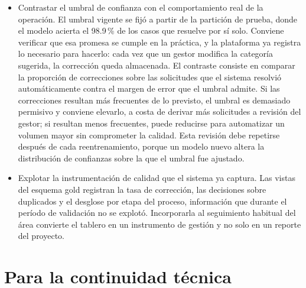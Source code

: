\begin{itemize}
\item Contrastar el umbral de confianza con el comportamiento real de la operación. El umbral vigente se fijó a partir de la partición de prueba, donde el modelo acierta el 98.9\,\% de los casos que resuelve por sí solo. Conviene verificar que esa promesa se cumple en la práctica, y la plataforma ya registra lo necesario para hacerlo: cada vez que un gestor modifica la categoría sugerida, la corrección queda almacenada. El contraste consiste en comparar la proporción de correcciones sobre las solicitudes que el sistema resolvió automáticamente contra el margen de error que el umbral admite. Si las correcciones resultan más frecuentes de lo previsto, el umbral es demasiado permisivo y conviene elevarlo, a costa de derivar más solicitudes a revisión del gestor; si resultan menos frecuentes, puede reducirse para automatizar un volumen mayor sin comprometer la calidad. Esta revisión debe repetirse después de cada reentrenamiento, porque un modelo nuevo altera la distribución de confianzas sobre la que el umbral fue ajustado.

\item Explotar la instrumentación de calidad que el sistema ya captura. Las vistas del esquema gold registran la tasa de corrección, las decisiones sobre duplicados y el desglose por etapa del proceso, información que durante el período de validación no se explotó. Incorporarla al seguimiento habitual del área convierte el tablero en un instrumento de gestión y no solo en un reporte del proyecto.
\end{itemize}

\section*{Para la continuidad técnica}

